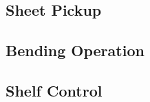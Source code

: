 \subsection{Sheet Pickup}
\label{subsec:sheet-pickup}

\FloatBarrier  %

\subsection{Bending Operation}
\label{subsec:bending-operation}

\FloatBarrier  %

\subsection{Shelf Control}
\label{subsec:shelf-control}

\FloatBarrier  %



